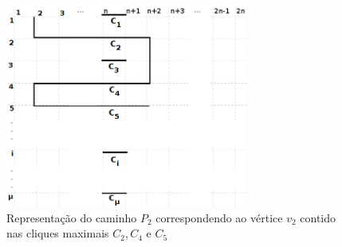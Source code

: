 \begin{figure}[htb]	
\center%
\includegraphics[width=8cm]{./img/grade3.png}
\caption{Representação do caminho $P_2$ correspondendo ao vértice $v_2$ contido nas cliques maximais $C_2, C_4$ e $C_5$}
\label{fig:gradeDemonstracao}
\end{figure}